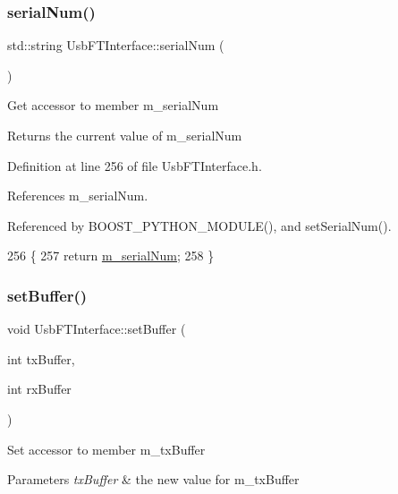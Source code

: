 \subsubsection{\texorpdfstring{serial\+Num()}{serialNum()}}
{\footnotesize\ttfamily std\+::string Usb\+F\+T\+Interface\+::serial\+Num (\begin{DoxyParamCaption}{ }\end{DoxyParamCaption})\hspace{0.3cm}{\ttfamily [inline]}}

Get accessor to member m\+\_\+serial\+Num \begin{DoxyReturn}{Returns}
the current value of m\+\_\+serial\+Num 
\end{DoxyReturn}


Definition at line 256 of file Usb\+F\+T\+Interface.\+h.



References m\+\_\+serial\+Num.



Referenced by B\+O\+O\+S\+T\+\_\+\+P\+Y\+T\+H\+O\+N\+\_\+\+M\+O\+D\+U\+L\+E(), and set\+Serial\+Num().


\begin{DoxyCode}
256                          \{
257     \textcolor{keywordflow}{return} \hyperlink{classUsbFTInterface_a031610ca38939734ec7431d80f5f299f}{m\_serialNum};
258   \}
\end{DoxyCode}
\mbox{\label{classUsbFTInterface_aaa09fdc28deb45d0a65f5d42c06dd659}} 
\subsubsection{\texorpdfstring{set\+Buffer()}{setBuffer()}}
{\footnotesize\ttfamily void Usb\+F\+T\+Interface\+::set\+Buffer (\begin{DoxyParamCaption}\item[{int}]{tx\+Buffer,  }\item[{int}]{rx\+Buffer }\end{DoxyParamCaption})\hspace{0.3cm}{\ttfamily [inline]}}

Set accessor to member m\+\_\+tx\+Buffer 
\begin{DoxyParams}{Parameters}
{\em tx\+Buffer} & the new value for m\+\_\+tx\+Buffer \\
\hline
\end{DoxyParams}


